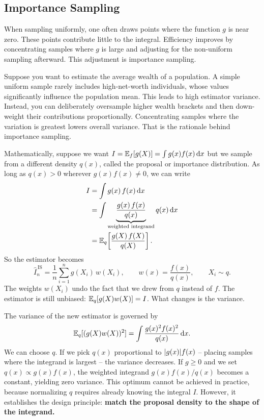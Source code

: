 \subsection{Importance Sampling}
\label{ch35:importance}
When sampling uniformly, one often draws points where the function $g$ is near zero.
These points contribute little to the integral. Efficiency improves by concentrating
samples where $g$ is large and adjusting for the non-uniform sampling afterward.
This adjustment is importance sampling.
\begin{intuitionbox}
Suppose you want to estimate the average wealth of a population. A simple uniform
sample rarely includes high-net-worth individuals, whose values significantly influence
the population mean. This leads to high estimator variance. Instead, you can
deliberately oversample higher wealth brackets and then down-weight their contributions
proportionally. Concentrating samples where the variation is greatest lowers overall variance.
That is the rationale behind importance sampling.
\end{intuitionbox}
Mathematically, suppose we want $I = \operatorname{\mathbb{E}}_f[g(X)] = \int g(x) f(x)\,\mathrm{d} x$ but we
sample from a different density $q(x)$, called the proposal or importance
distribution. As long as $q(x) > 0$ wherever $g(x)f(x) \ne 0$, we can write
\begin{align*}
  I &= \int g(x)\,f(x)\,\mathrm{d} x \\
    &= \int \underbrace{\frac{g(x)\,f(x)}{q(x)}}_{\text{weighted integrand}} q(x)\,\mathrm{d} x \\
    &= \operatorname{\mathbb{E}}_q\!\left[\frac{g(X)\,f(X)}{q(X)}\right].
\end{align*}
So the estimator becomes
\[
  \hat I_n^{\,\mathrm{IS}} = \frac1n \sum_{i=1}^n g(X_i)\,w(X_i),
  \qquad w(x) = \frac{f(x)}{q(x)},
  \qquad X_i \sim q.
\]
The weights $w(X_i)$ undo the fact that we drew from $q$ instead of $f$. The
estimator is still unbiased: $\operatorname{\mathbb{E}}_q[g(X)w(X)] = I$. What changes is the variance.
\begin{whybox}
The variance of the new estimator is governed by
\[
  \operatorname{\mathbb{E}}_q[(g(X)w(X))^2] = \int \frac{g(x)^2 f(x)^2}{q(x)}\,\mathrm{d} x.
\]
We can choose $q$. If we pick $q(x)$ proportional to $\lvert g(x)\rvert f(x)$ -- placing samples where
the integrand is largest -- the variance decreases. If $g \ge 0$ and we set $q(x) \propto g(x) f(x)$,
the weighted integrand $g(x)f(x)/q(x)$ becomes a constant, yielding zero variance.
This optimum cannot be achieved in practice, because normalizing $q$ requires already knowing the integral $I$.
However, it establishes the design principle: \textbf{match the proposal density to the shape of the integrand.}
\end{whybox}
